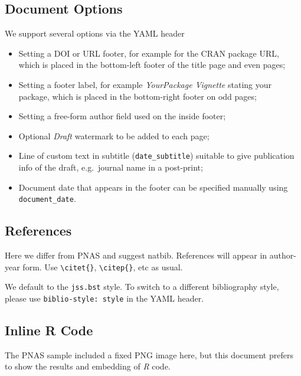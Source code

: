 \documentclass[letterpaper,10pt,twocolumn,twoside,]{pinp}
\providecommand{\tightlist}{%
  \setlength{\itemsep}{0pt}\setlength{\parskip}{0pt}}
\begin{document}
\hypertarget{document-options}{%
\subsection{Document Options}\label{document-options}}

We support several options via the YAML header

\begin{itemize}
\tightlist
\item
  Setting a DOI or URL footer, for example for the CRAN package URL,
  which is placed in the bottom-left footer of the title page and even
  pages;
\item
  Setting a footer label, for example \emph{YourPackage Vignette}
  stating your package, which is placed in the bottom-right footer on
  odd pages;
\item
  Setting a free-form author field used on the inside footer;
\item
  Optional \emph{Draft} watermark to be added to each page;
\item
  Line of custom text in subtitle (\texttt{date\_subtitle}) suitable to
  give publication info of the draft, e.g.~journal name in a post-print;
\item
  Document date that appears in the footer can be specified manually
  using \texttt{document\_date}.
\end{itemize}

\hypertarget{references}{%
\subsection{References}\label{references}}

Here we differ from PNAS and suggest natbib. References will appear in
author-year form. Use \texttt{\textbackslash{}citet\{\}},
\texttt{\textbackslash{}citep\{\}}, etc as usual.

We default to the \texttt{jss.bst} style. To switch to a different
bibliography style, please use \texttt{biblio-style:\ style} in the YAML
header.

\hypertarget{inline-r-code}{%
\subsection{Inline R Code}\label{inline-r-code}}

The PNAS sample included a fixed PNG image here, but this document
prefers to show the results and embedding of \emph{R} code.
\end{document}
